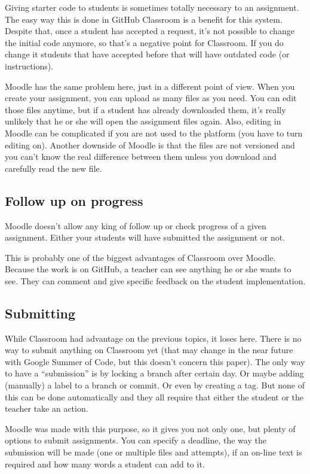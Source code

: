 \documentclass[12pt]{article}
\begin{document}
Giving starter code to students is sometimes totally necessary to an assignment. The easy way this is done in GitHub Classroom is a benefit for this system. Despite that, once a student has accepted a request, it's not possible to change the initial code anymore, so that's a negative point for Classroom. If you do change it students that have accepted before that will have outdated code (or instructions).

Moodle has the same problem here, just in a different point of view. When you create your assignment, you can upload as many files as you need. You can edit those files anytime, but if a student has already downloaded them, it's really unlikely that he or she will open the assignment files again. Also, editing in Moodle can be complicated if you are not used to the platform (you have to turn editing on). Another downside of Moodle is that the files are not versioned and you can't know the real difference between them unless you download and carefully read the new file.

\subsection{Follow up on progress}

Moodle doesn't allow any king of follow up or check progress of a given assignment. Either your students will have submitted the assignment or not.

This is probably one of the biggest advantages of Classroom over Moodle. Because the work is on GitHub, a teacher can see anything he or she wants to see. They can comment and give specific feedback on the student implementation.

\subsection{Submitting}

While Classroom had advantage on the previous topics, it loses here. There is no way to submit anything on Classroom yet (that may change in the near future with Google Summer of Code, but this doesn't concern this paper). The only way to have a ``submission'' is by locking a branch after certain day. Or maybe adding (manually) a label to a branch or commit. Or even by creating a tag. But none of this can be done automatically and they all require that either the student or the teacher take an action.

Moodle was made with this purpose, so it gives you not only one, but plenty of options to submit assignments. You can specify a deadline, the way the submission will be made (one or multiple files and attempts), if an on-line text is required and how many words a student can add to it.
\end{document}
